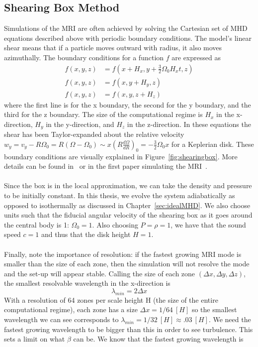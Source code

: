 \subsection{Shearing Box Method}\label{ssec:shearingbox}
Simulations of the MRI are often achieved by solving the Cartesian set of MHD equations described above with periodic boundary conditions. The model's linear shear means that if a particle moves outward with radius, it also moves azimuthally. The boundary conditions for a function $f$ are expressed as
\begin{align}
  f(x,y,z)&=f(x+H_x,y+\frac32\Omega_0H_xt,z)\label{eq:bcx}\\
  f(x,y,z)&=f(x,y+H_y,z)\label{eq:bcy}\\
  f(x,y,z)&=f(x,y,z+H_z)\label{eq:bcz}
\end{align}
where the first line is for the x boundary, the second for the y boundary, and the third for the z boundary. The size of the computational regime is $H_x$ in the x-direction, $H_y$ in the y-direction, and $H_z$ in the z-direction. In these equations the shear has been Taylor-expanded about the relative velocity $w_y=v_y-R\Omega_0=R(\Omega-\Omega_0)\sim x\left(R\frac{d\Omega}{dR}\right)_0=-\frac32\Omega_0x$ for a Keplerian disk. These boundary conditions are visually explained in Figure~\ref{fig:shearingbox}. More details can be found in~ or in the first paper simulating the MRI~\cite{BH1991c}. \\
\\
Since the box is in the local approximation, we can take the density and pressure to be initially constant. In this thesis, we evolve the system adiabatically as opposed to isothermally as discussed in Chapter~\ref{sec:idealMHD}. We also choose units such that the fiducial angular velocity of the shearing box as it goes around the central body is 1: $\Omega_0=1$. Also choosing $P=\rho=1$, we have that the sound speed $c=1$ and thus that the disk height $H=1$. \\
\\
Finally, note the importance of resolution: if the fastest growing MRI mode is smaller than the size of each zone, then the simulation will not resolve the mode and the set-up will appear stable. Calling the size of each zone $(\Delta x,\Delta y,\Delta z)$, the smallest resolvable wavelength in the x-direction is
\begin{equation*}
  \lambda_{min}=2\Delta x
\end{equation*}
With a resolution of 64 zones per scale height H (the size of the entire computational regime), each zone has a size $\Delta x=1/64~[H]$ so the smallest wavelength we can see corresponds to $\lambda_{min}=1/32~[H]\approx.03~[H]$. We need the fastest growing wavelength to be bigger than this in order to see turbulence. This sets a limit on what $\beta$ can be. We know that the fastest growing wavelength is
